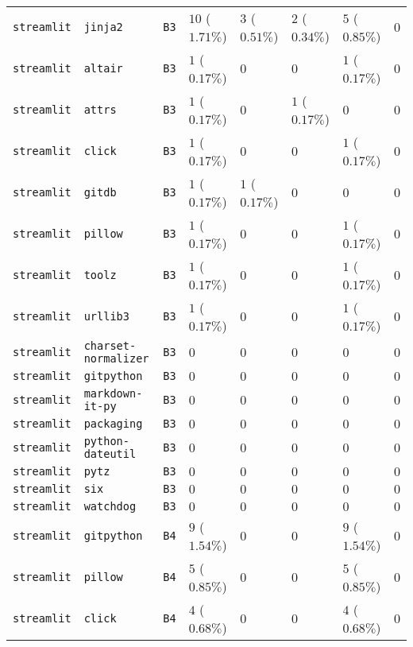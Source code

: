 \begin{table}
\begin{tabular}{llllllll}
\texttt{streamlit} & \texttt{jinja2} & \texttt{B3} & $10$ ($1.71\%$) & $3$ ($0.51\%$) & $2$ ($0.34\%$) & $5$ ($0.85\%$) & $0$ \\
\texttt{streamlit} & \texttt{altair} & \texttt{B3} & $1$ ($0.17\%$) & $0$ & $0$ & $1$ ($0.17\%$) & $0$ \\
\texttt{streamlit} & \texttt{attrs} & \texttt{B3} & $1$ ($0.17\%$) & $0$ & $1$ ($0.17\%$) & $0$ & $0$ \\
\texttt{streamlit} & \texttt{click} & \texttt{B3} & $1$ ($0.17\%$) & $0$ & $0$ & $1$ ($0.17\%$) & $0$ \\
\texttt{streamlit} & \texttt{gitdb} & \texttt{B3} & $1$ ($0.17\%$) & $1$ ($0.17\%$) & $0$ & $0$ & $0$ \\
\texttt{streamlit} & \texttt{pillow} & \texttt{B3} & $1$ ($0.17\%$) & $0$ & $0$ & $1$ ($0.17\%$) & $0$ \\
\texttt{streamlit} & \texttt{toolz} & \texttt{B3} & $1$ ($0.17\%$) & $0$ & $0$ & $1$ ($0.17\%$) & $0$ \\
\texttt{streamlit} & \texttt{urllib3} & \texttt{B3} & $1$ ($0.17\%$) & $0$ & $0$ & $1$ ($0.17\%$) & $0$ \\
\texttt{streamlit} & \texttt{charset-normalizer} & \texttt{B3} & $0$ & $0$ & $0$ & $0$ & $0$ \\
\texttt{streamlit} & \texttt{gitpython} & \texttt{B3} & $0$ & $0$ & $0$ & $0$ & $0$ \\
\texttt{streamlit} & \texttt{markdown-it-py} & \texttt{B3} & $0$ & $0$ & $0$ & $0$ & $0$ \\
\texttt{streamlit} & \texttt{packaging} & \texttt{B3} & $0$ & $0$ & $0$ & $0$ & $0$ \\
\texttt{streamlit} & \texttt{python-dateutil} & \texttt{B3} & $0$ & $0$ & $0$ & $0$ & $0$ \\
\texttt{streamlit} & \texttt{pytz} & \texttt{B3} & $0$ & $0$ & $0$ & $0$ & $0$ \\
\texttt{streamlit} & \texttt{six} & \texttt{B3} & $0$ & $0$ & $0$ & $0$ & $0$ \\
\texttt{streamlit} & \texttt{watchdog} & \texttt{B3} & $0$ & $0$ & $0$ & $0$ & $0$ \\
\texttt{streamlit} & \texttt{gitpython} & \texttt{B4} & $9$ ($1.54\%$) & $0$ & $0$ & $9$ ($1.54\%$) & $0$ \\
\texttt{streamlit} & \texttt{pillow} & \texttt{B4} & $5$ ($0.85\%$) & $0$ & $0$ & $5$ ($0.85\%$) & $0$ \\
\texttt{streamlit} & \texttt{click} & \texttt{B4} & $4$ ($0.68\%$) & $0$ & $0$ & $4$ ($0.68\%$) & $0$ \\

\end{tabular}
\end{table}
